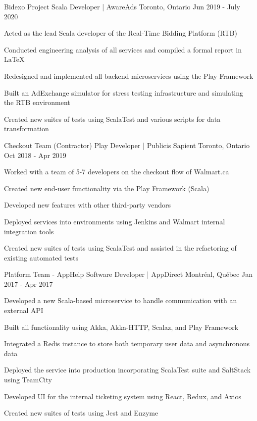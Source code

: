 \begin{cventries}
\cventry
    {Bidexo Project}
    {Scala Developer | AwareAds}
    {Toronto, Ontario}
    {Jun 2019 - July 2020}
    {
      \begin{cvitems}
        \item {Acted as the lead Scala developer of the Real-Time Bidding Platform (RTB)}
        \item {Conducted engineering analysis of all services and compiled a formal report in \LaTeX}
        \item {Redesigned and implemented all backend microservices using the Play Framework}
        \item {Built an AdExchange simulator for stress testing infrastructure and simulating the RTB environment}
        \item {Created new suites of tests using ScalaTest and various scripts for data transformation}
      \end{cvitems}
    }

\cventry
    {Checkout Team}
    {(Contractor) Play Developer | Publicis Sapient}
    {Toronto, Ontario}
    {Oct 2018 - Apr 2019}
    {
      \begin{cvitems}
        \item {Worked with a team of 5-7 developers on the checkout flow of Walmart.ca}
        \item {Created new end-user functionality via the Play Framework (Scala)}
        \item {Developed new features with other third-party vendors}
        \item {Deployed services into environments using Jenkins and Walmart internal integration tools}
        \item {Created new suites of tests using ScalaTest and assisted in the refactoring of existing automated tests}
      \end{cvitems}
    }

\cventry
    {Platform Team - AppHelp}
    {Software Developer | AppDirect}
    {Montréal, Québec}
    {Jan 2017 - Apr 2017 }
    {
      \begin{cvitems}
        \item {Developed a new Scala-based microservice to handle communication with an external API}
        \item {Built all functionality using Akka, Akka-HTTP, Scalaz, and Play Framework}
        \item {Integrated a Redis instance to store both temporary user data and asynchronous data}
        \item {Deployed the service into production incorporating ScalaTest suite and SaltStack using TeamCity}
        \item {Developed UI for the internal ticketing system using React, Redux, and Axios}
        \item {Created new suites of tests using Jest and Enzyme}
      \end{cvitems}
    }


\end{cventries}
